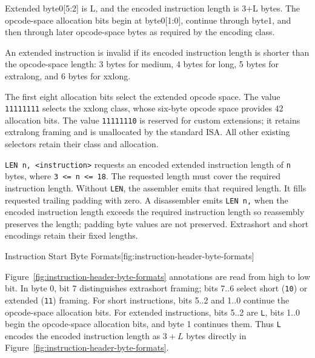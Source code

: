 Extended byte0[5:2] is L, and the encoded instruction length is 3+L bytes. The opcode-space allocation bits begin at
byte0[1:0], continue through byte1, and then through later opcode-space bytes as required by the encoding class.

An extended instruction is invalid if its encoded instruction length is shorter than the opcode-space length: 3 bytes
for medium, 4 bytes for long, 5 bytes for extralong, and 6 bytes for xxlong.

The first eight allocation bits select the extended opcode space.
The value \texttt{11111111} selects the xxlong class, whose six-byte opcode space provides 42
allocation bits. The value \texttt{11111110} is reserved for custom extensions; it retains extralong framing and is
unallocated by the standard ISA. All other existing selectors retain their class and allocation.

\texttt{LEN n, <instruction>} requests an encoded extended instruction length of \texttt{n} bytes, where
\texttt{3 <= n <= 18}. The requested length must cover the required instruction length. Without \texttt{LEN}, the
assembler emits that required length. It fills requested trailing padding with zero. A disassembler emits
\texttt{LEN n,} when the encoded instruction length exceeds the required instruction length so reassembly preserves
the length; padding byte values are not preserved. Extrashort and short encodings retain their fixed lengths.

\begin{manuallistedbitdiagram}{Instruction Start Byte Formats}[fig:instruction-header-byte-formats]
\end{manuallistedbitdiagram}

Figure~\ref{fig:instruction-header-byte-formats} annotations are read from high to low bit. In byte 0, bit 7 distinguishes extrashort framing; bits 7..6
select short (\texttt{10}) or extended (\texttt{11}) framing. For short instructions, bits 5..2 and 1..0 continue
the opcode-space allocation bits. For extended instructions, bits 5..2 are \texttt{L}, bits 1..0 begin the
opcode-space allocation bits, and byte 1 continues them. Thus \texttt{L} encodes the encoded instruction length as
$3+L$ bytes directly in
Figure~\ref{fig:instruction-header-byte-formats}.

